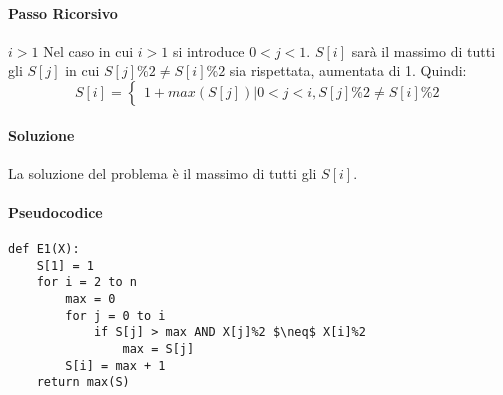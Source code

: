 \documentclass[12pt, a4paper, openany]{book}
\begin{document}
\paragraph*{Passo Ricorsivo} $i>1$
Nel caso in cui $i>1$ si introduce $0<j<1$. 
$S[i]$ sarà il massimo di tutti gli $S[j]$ in cui $S[j]\%2 \neq S[i]\%2$ sia rispettata, aumentata di 1.
Quindi:
$$
S[i]= \begin{cases}
	1 + max(S[j]) | 0 < j < i, S[j]\%2 \neq S[i]\%2
\end{cases}
$$
\paragraph*{Soluzione}
La soluzione del problema è il massimo di tutti gli $S[i]$.

\paragraph*{Pseudocodice}
\begin{lstlisting}[style=small]
def E1(X):
	S[1] = 1
	for i = 2 to n
		max = 0
		for j = 0 to i
			if S[j] > max AND X[j]%2 $\neq$ X[i]%2
				max = S[j]
		S[i] = max + 1
	return max(S) 
	
\end{lstlisting}
\end{document}
